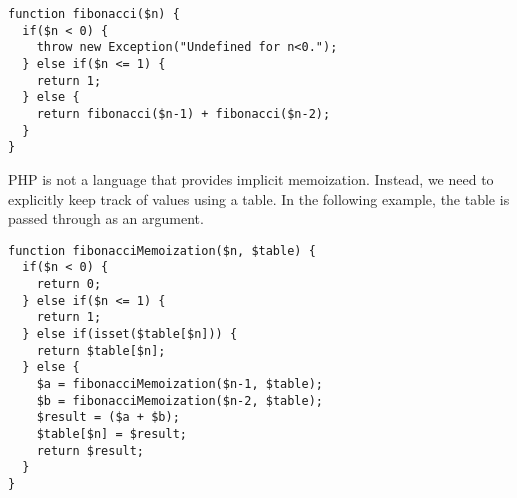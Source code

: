\begin{verbatim}
function fibonacci($n) {
  if($n < 0) {
    throw new Exception("Undefined for n<0.");
  } else if($n <= 1) {
    return 1;
  } else {
    return fibonacci($n-1) + fibonacci($n-2);
  }
}
\end{verbatim}

PHP is not a language that provides implicit memoization.  Instead, 
we need to explicitly keep track of values using a table.  In the
following example, the table is passed through as an argument.

\begin{verbatim}
function fibonacciMemoization($n, $table) {
  if($n < 0) {
    return 0;
  } else if($n <= 1) {
    return 1;
  } else if(isset($table[$n])) {
    return $table[$n];
  } else {
    $a = fibonacciMemoization($n-1, $table);
    $b = fibonacciMemoization($n-2, $table);
    $result = ($a + $b);
    $table[$n] = $result;
    return $result;
  }
}
\end{verbatim}


